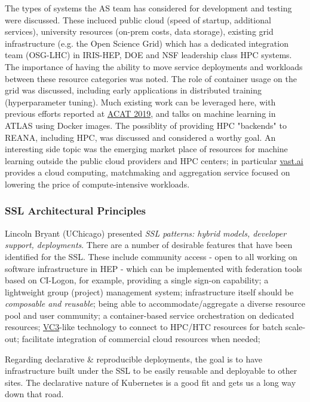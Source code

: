 \documentclass[11pt,letterpaper,fleqn]{article}
\begin{document}
The types of systems the AS team has considered for development and testing were discussed.  These incluced public cloud (speed of startup, additional services), university resources (on-prem costs, data storage), existing grid infrastructure (e.g. the Open Science Grid) which has a dedicated integration team (OSG-LHC) in IRIS-HEP, DOE and NSF leadership class HPC systems.  The importance of having the ability to move service deployments and workloads between these resource categories was noted.
The role of container usage on the grid was discussed, including early applications in distributed training (hyperparameter tuning).  Much existing work can be leveraged here, with previous efforts reported at \href{https://indico.cern.ch/event/708041/}{ACAT 2019}, and talks on machine learning in ATLAS using Docker images.
The possiblity of providing HPC "backends" to REANA, including HPC, was discussed and considered a worthy goal.  An interesting side topic was the emerging market place of resources for machine learning outside the public cloud providers and HPC centers; in particular \href{Vast.ai}{vast.ai} provides a cloud computing,   matchmaking and aggregation service focused on lowering the price of compute-intensive workloads.


\subsubsection{SSL Architectural Principles}
Lincoln Bryant (UChicago) presented {\it SSL patterns: hybrid models, developer support, deployments}.  There are a number of desirable features that have been identified for the SSL.  These include community access - open to all working on software infrastructure in HEP - which can be implemented with federation tools based on CI-Logon, for example, providing a single sign-on capability; a lightweight group (project) management system; infrastructure itself should be {\it composable and reusable}; being able to accommodate/aggregate a diverse resource pool and user community; a container-based service orchestration on dedicated resources; \href{http://www.virtualclusters.org/}{VC3}-like technology to connect to HPC/HTC resources for batch scale-out; facilitate integration of commercial cloud resources when needed;

Regarding declarative \& reproducible deployments, the goal is to have infrastructure built under the SSL to be easily reusable and deployable to other sites. The
declarative nature of Kubernetes is a good fit and gets us a long way down that road.
\end{document}
